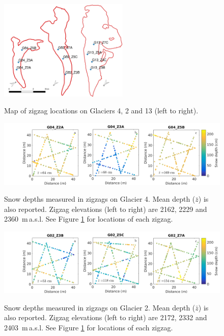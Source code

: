 \documentclass{sfuthesis}
\begin{document}
\begin{figure}
	\centering
	\includegraphics[width = 0.55\textwidth]{map_zigzaglocation_all.jpeg}\\
	\caption{Map of zigzag locations on Glaciers 4, 2 and 13 (left to right).}
	\label{fig:ZZ_locations}
\end{figure}

\begin{landscape}
\begin{figure}
	\centering
	\includegraphics[width = 21 cm]{ZigzagDepth_G04.png}\\
	\caption{Snow depths measured in zigzags on Glacier 4. Mean depth ($\bar{z}$) is also reported. Zigzag elevations (left to right) are 2162, 2229 and 2360 \,m\,a.s.l. See Figure \ref{fig:ZZ_locations} for locations of each zigzag.}
	\label{fig:ZZ_G04}
\end{figure}

\begin{figure}
	\centering
	\includegraphics[width = 21 cm]{ZigzagDepth_G02.png}\\
	\caption{Snow depths measured in  zigzags on Glacier 2. Mean depth ($\bar{z}$) is also reported. Zigzag elevations (left to right) are 2172, 2332 and 2403 \,m\,a.s.l. See Figure \ref{fig:ZZ_locations} for locations of each zigzag.}
	\label{fig:ZZ_G02}
\end{figure}
\end{landscape}
\end{document}
